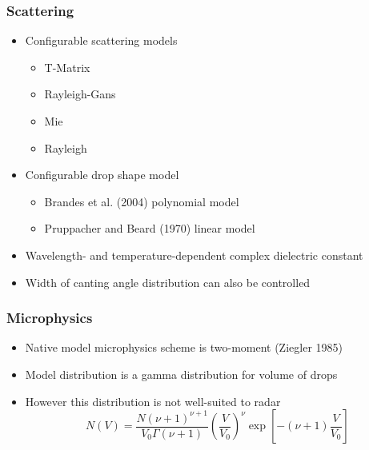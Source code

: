 \documentclass[red]{beamer}
\begin{document}
\begin{frame}
	\frametitle{Scattering}
	\begin{itemize}
		\item Configurable scattering models
		\begin{itemize}
			\item T-Matrix
			\item Rayleigh-Gans
			\item Mie
			\item Rayleigh
			\end{itemize}
		\item Configurable drop shape model
		\begin{itemize}
			\item Brandes et al. (2004) polynomial model
			\item Pruppacher and Beard (1970) linear model
			\end{itemize}
		\item Wavelength- and temperature-dependent complex dielectric constant
		\item Width of canting angle distribution can also be controlled
	\end{itemize}
\end{frame}

\begin{frame}[<+->]
	\frametitle{Microphysics}
	\begin{itemize}
		\item Native model microphysics scheme is two-moment (Ziegler 1985)
		\item Model distribution is a gamma distribution for volume of drops
		\item However this distribution is not well-suited to radar
		\begin{equation}
			N(V) = \frac{N (\nu + 1)^{\nu + 1}}{V_0 \Gamma(\nu + 1)}
        \left(\frac{V}{V_0}\right)^{\nu}
        \exp\left[{-(\nu + 1) \frac{V}{V_0}}\right]
		\end{equation}
	\end{itemize}
\end{frame}
\end{document}
